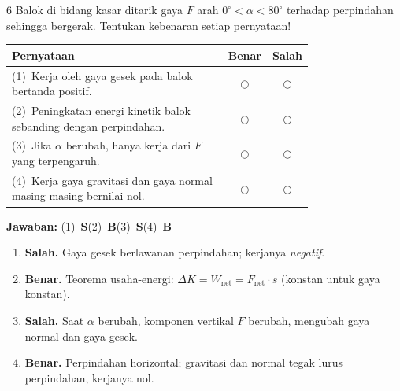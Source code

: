 \documentclass[11pt]{article}
\newcommand{\jawaban}[1]{%
  \noindent\colorbox{gold!30}{\parbox{\dimexpr\linewidth-2\fboxsep\relax}{%
    \textbf{Jawaban:} #1}}\par\smallskip}
\begin{document}
\begin{soal}{6}
Balok di bidang kasar ditarik gaya $F$ arah $0^\circ<\alpha<80^\circ$
terhadap perpindahan sehingga bergerak. Tentukan kebenaran setiap pernyataan!

\par\smallskip
{\renewcommand{\arraystretch}{1.4}%
\begin{tabular}{@{}p{0.76\linewidth}cc@{}}
\hline\textbf{Pernyataan}&\textbf{Benar}&\textbf{Salah}\\\hline
(1)~Kerja oleh gaya gesek pada balok bertanda positif.&$\bigcirc$&$\bigcirc$\\
(2)~Peningkatan energi kinetik balok sebanding dengan perpindahan.&$\bigcirc$&$\bigcirc$\\
(3)~Jika $\alpha$ berubah, hanya kerja dari $F$ yang terpengaruh.&$\bigcirc$&$\bigcirc$\\
(4)~Kerja gaya gravitasi dan gaya normal masing-masing bernilai nol.&$\bigcirc$&$\bigcirc$\\\hline
\end{tabular}}
\end{soal}
\begin{pembox}
\jawaban{(1)~\textbf{S}\quad(2)~\textbf{B}\quad(3)~\textbf{S}\quad(4)~\textbf{B}}
\begin{enumerate}[leftmargin=*,topsep=2pt,itemsep=2pt]
\item \textbf{Salah.} Gaya gesek berlawanan perpindahan; kerjanya \emph{negatif}.
\item \textbf{Benar.} Teorema usaha-energi: $\Delta K=W_{\text{net}}=F_{\text{net}}\cdot s$ (konstan untuk gaya konstan).
\item \textbf{Salah.} Saat $\alpha$ berubah, komponen vertikal $F$ berubah, mengubah gaya normal dan gaya gesek.
\item \textbf{Benar.} Perpindahan horizontal; gravitasi dan normal tegak lurus perpindahan, kerjanya nol.
\end{enumerate}
\end{pembox}
\end{document}
